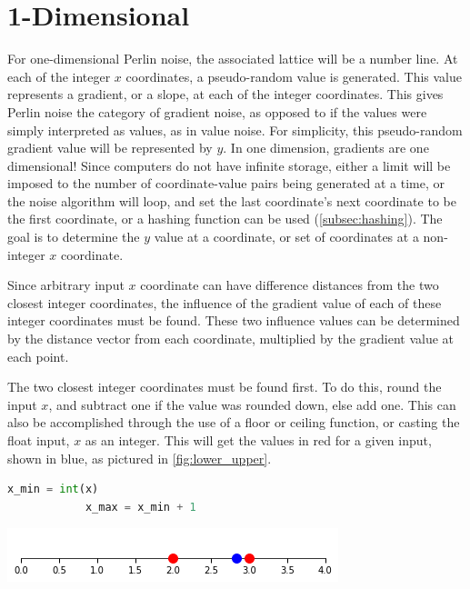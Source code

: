 \documentclass[10pt]{report}
\begin{document}
		\section{1-Dimensional} \label{sec:1d}
		
		For one-dimensional Perlin noise, the associated lattice will be a number line. At each of the integer \(x\) coordinates, a pseudo-random value is generated. This value represents a gradient, or a slope, at each of the integer coordinates. This gives Perlin noise the category of gradient noise, as opposed to if the values were simply interpreted as values, as in value noise. For simplicity, this pseudo-random gradient value will be represented by \(y\). In one dimension, gradients are one dimensional! Since computers do not have infinite storage, either a limit will be imposed to the number of coordinate-value pairs being generated at a time, or the noise algorithm will loop, and set the last coordinate's next coordinate to be the first coordinate, or a hashing function can be used (\ref{subsec:hashing}). The goal is to determine the \(y\) value at a coordinate, or set of coordinates at a non-integer \(x\) coordinate.
		
		Since arbitrary input \(x\) coordinate can have difference distances from the two closest integer coordinates, the influence of the gradient value of each of these integer coordinates must be found. These two influence values can be determined by the distance vector from each coordinate, multiplied by the gradient value at each point. 
		
		The two closest integer coordinates must be found first. To do this, round the input \(x\), and subtract one if the value was rounded down, else add one. This can also be accomplished through the use of a floor or ceiling function, or casting the float input, \(x\) as an integer. This will get the values in red for a given input, shown in blue, as pictured in \autoref{fig:lower_upper}.
		
		\begin{lstlisting}[label={lst:minmax}, language=Python, frame=none, caption={An example of finding the min and max bounds in 1D Perlin noise, given input x.}, captionpos=b]
			x_min = int(x)
			x_max = x_min + 1
		\end{lstlisting}
	
		\begin{minipage}{\textwidth}
			\centering
			\includegraphics[scale=0.75]{lower_upper}
			\label{fig:lower_upper}
		\end{minipage}
	
\end{document}
